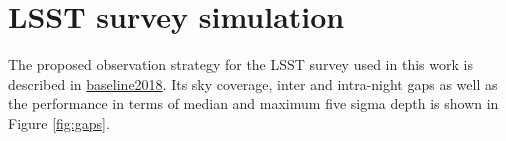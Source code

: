 %
\section{LSST survey simulation} \label{sec:lsstss}
The proposed observation strategy for the \gls{LSST} survey used in this work is described in \href{http://astro-lsst-01.astro.washington.edu:8080/multiColor?runId=1#Fivesigmadepth}{baseline2018}. Its sky coverage, inter and intra-night gaps as well as the performance in terms of median and maximum five sigma depth is shown in Figure \ref{fig:gaps}.

